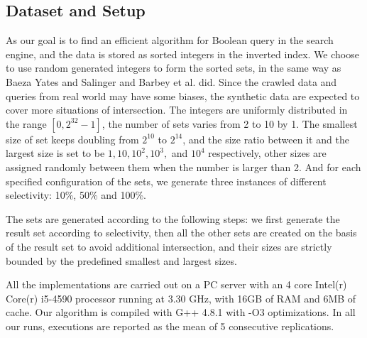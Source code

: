 \documentclass[runningheads,a4paper]{llncs}
\begin{document}
\subsection{Dataset and Setup}
As our goal is to find an efficient algorithm for Boolean query in the search engine, and the data is stored as sorted integers in the inverted index.
We choose to use random generated integers to form the sorted sets, in the same way as Baeza Yates and Salinger \cite{Baezayates2005Experimental} and Barbey et al. \cite{J2010An} did.
Since the crawled data and queries from real world may have some biases, the synthetic data are expected to cover more situations of intersection.
The integers are uniformly distributed in the range $ [0,2^{32}-1] $, the number of sets varies from 2 to 10 by 1.
The smallest size of set keeps doubling from $ 2^{10} $ to $ 2^{14} $, and the size ratio between it and the largest size is set to be  $ 1, 10, 10^2, 10^3,$ and $ 10^4 $ respectively, other sizes are assigned randomly between them when the number is larger than 2.
And for each specified configuration of the sets, we generate three instances of different selectivity: 10\%, 50\% and 100\%.

The sets are generated according to the following steps: we first generate the result set according to selectivity, then all the other sets are created on the basis of the result set to avoid additional intersection, and their sizes are strictly bounded by the predefined smallest and largest sizes.

All the implementations are carried out on a PC server with an 4 core Intel(r) Core(r) i5-4590 processor running at 3.30 GHz, with 16GB of RAM and 6MB of cache. Our algorithm is compiled with G++ 4.8.1 with -O3 optimizations. In all our runs, executions are reported as the mean of 5 consecutive replications.
\end{document}
